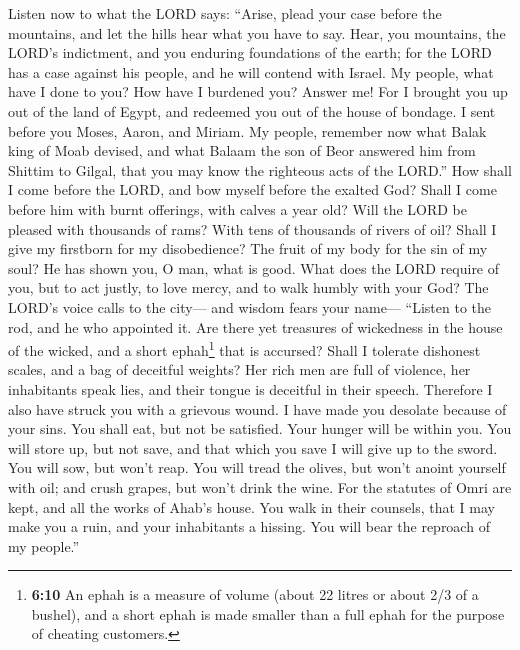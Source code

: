  Listen now to what the LORD says: ``Arise, plead your
case before the mountains, and let the hills hear what you have to say.
 Hear, you mountains, the LORD's indictment, and you
enduring foundations of the earth; for the LORD has a case against his
people, and he will contend with Israel.  My people, what
have I done to you? How have I burdened you? Answer me! 
For I brought you up out of the land of Egypt, and redeemed you out of
the house of bondage. I sent before you Moses, Aaron, and Miriam.
 My people, remember now what Balak king of Moab devised,
and what Balaam the son of Beor answered him from Shittim to Gilgal,
that you may know the righteous acts of the LORD.''  How
shall I come before the LORD, and bow myself before the exalted God?
Shall I come before him with burnt offerings, with calves a year old?
 Will the LORD be pleased with thousands of rams? With
tens of thousands of rivers of oil? Shall I give my firstborn for my
disobedience? The fruit of my body for the sin of my soul?
 He has shown you, O man, what is good. What does the LORD
require of you, but to act justly, to love mercy, and to walk humbly
with your God?  The LORD's voice calls to the city--- and
wisdom fears your name--- ``Listen to the rod, and he who appointed it.
 Are there yet treasures of wickedness in the house of
the wicked, and a short ephah\footnote{\textbf{6:10} An ephah is a
  measure of volume (about 22 litres or about 2/3 of a bushel), and a
  short ephah is made smaller than a full ephah for the purpose of
  cheating customers.} that is accursed?  Shall I
tolerate dishonest scales, and a bag of deceitful weights?
 Her rich men are full of violence, her inhabitants speak
lies, and their tongue is deceitful in their speech. 
Therefore I also have struck you with a grievous wound. I have made you
desolate because of your sins.  You shall eat, but not be
satisfied. Your hunger will be within you. You will store up, but not
save, and that which you save I will give up to the sword.
 You will sow, but won't reap. You will tread the olives,
but won't anoint yourself with oil; and crush grapes, but won't drink
the wine.  For the statutes of Omri are kept, and all the
works of Ahab's house. You walk in their counsels, that I may make you a
ruin, and your inhabitants a hissing. You will bear the reproach of my
people.''

